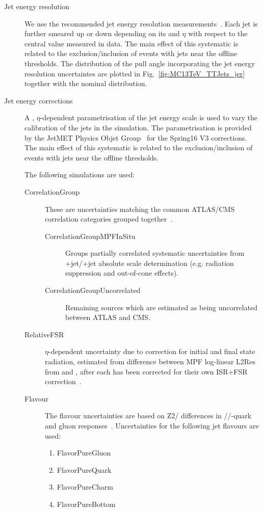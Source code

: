 \begin{description}
\item[Jet energy resolution] We use the recommended jet energy resolution measurements~\cite{twiki:JER}. Each jet is further smeared up or down depending on its \pt and $\eta$ with respect to the central value measured in data. The main effect of this systematic is related to the exclusion/inclusion of events with jets near the offline thresholds. The distribution of the pull angle incorporating the jet energy resolution uncertaintes are plotted in Fig.~\ref{fig:MC13TeV_TTJets_jer} together with the nominal distribution.

\item[Jet energy corrections] A \pt, $\eta$-dependent parametrisation of the jet energy scale is used to vary the calibration of the jets in the simulation. The parametrisation is provided by the JetMET Physics Objet Group~\cite{twiki:JES} for the Spring16 V3 corrections. The main effect of this systematic is related to the exclusion/inclusion of events with jets near the offline thresholds.

The following simulations are used:
\begin{description}
        \item[CorrelationGroup] These are uncertainties matching the common ATLAS/CMS correlation categories grouped together~\cite{twiki:JESUS}. 
        \begin{description}                     
              \item[CorrelationGroupMPFInSitu] Groups partially correlated systematic uncertainties from \cPZ+jet/\cPgg+jet absolute scale determination (e.g. radiation suppression and out-of-cone effects).
              \item[CorrelationGroupUncorrelated] Remaining sources which are estimated as being uncorrelated between ATLAS and CMS.
        \end{description}
        \item[RelativeFSR] $\eta$-dependent uncertainty due to correction for initial and final state radiation, estimated from difference between MPF log-linear L2Res from  and \HERWIGpp, after each has been corrected for their own ISR+FSR correction~\cite{Khachatryan:2016kdb}.
        \item[Flavour]  The flavour uncertainties are based on  Z2/ differences in \cPqu\cPqd\cPqs/\cPqc/\cPqb-quark and gluon responses~\cite{Khachatryan:2016kdb}. Uncertainties for the following jet flavours are used:
        \begin{enumerate}
                \item FlavorPureGluon
                \item FlavorPureQuark
                \item FlavorPureCharm
                \item FlavorPureBottom
        \end{enumerate}
\end{description}


\end{description}
